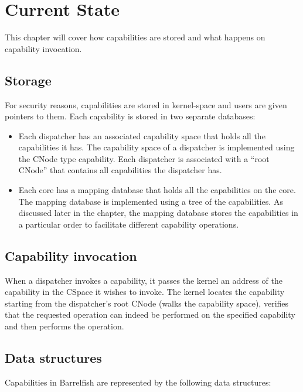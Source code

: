 \documentclass[a4paper,twoside]{report} %
\begin{document}
\chapter{Current State}\label{chap:current_state}

This chapter will cover how capabilities are stored and what happens
on capability invocation.

\section{Storage}\label{sec:cspace}
For security reasons, capabilities are stored in kernel-space and
users are given pointers to them. Each capability is stored in two
separate databases:

\begin{itemize}
\item Each dispatcher has an associated capability space that holds
  all the capabilities it has.  The capability space of a dispatcher
  is implemented using the CNode type capability. Each dispatcher is
  associated with a ``root CNode'' that contains all capabilities the
  dispatcher has.
\item Each core has a mapping database that holds all the capabilities on the
      core. The mapping database is implemented using a tree of the capabilities.
      As discussed later in the chapter, the mapping database stores the
      capabilities in a particular order to facilitate different capability
      operations.
\end{itemize}

\section{Capability invocation}\label{sec:sys_invoke}
When a dispatcher invokes a capability, it passes the kernel an
address of the capability in the CSpace it wishes to invoke. The
kernel locates the capability starting from the dispatcher's root
CNode (walks the capability space), verifies that the requested
operation can indeed be performed on the specified capability and then
performs the operation.

\section{Data structures}
Capabilities in Barrelfish are represented by the following data
structures:
\end{document}
